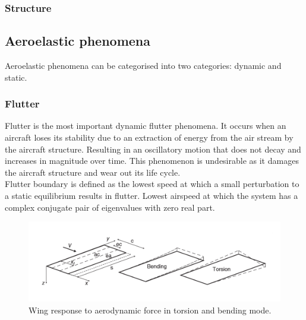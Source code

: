 \documentclass[11pt]{article}
\begin{document}
\subsubsection{Structure}

\subsection{Aeroelastic phenomena}
Aeroelastic phenomena can be categorised into two categories: dynamic and static.


\subsubsection{Flutter}
Flutter is the most important dynamic flutter phenomena\cite{MohammedFREEWINGS}. It occurs when an aircraft loses its stability due to an extraction of energy from the air stream by the aircraft structure. Resulting in an oscillatory motion that does not decay and increases in magnitude over time. This phenomenon is undesirable as it damages the aircraft structure and wear out its life cycle.\\

Flutter boundary is defined as  the lowest speed at which a small perturbation to a static equilibrium results in flutter. Lowest airspeed at which the system has a complex conjugate pair of eigenvalues with zero real part. 
\begin{figure}[h]
    \centering
    \includegraphics[width = .8\textwidth]{figures/torsion-bending-modes.png}
    \caption{Wing response to aerodynamic force in torsion and bending mode.}
    \label{fig:binary}
\end{figure}
\end{document}
